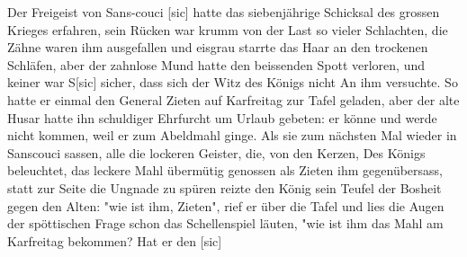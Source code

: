 \def\day{31.8.1942}
\mktitle

Der Freigeist von Sans-couci{\color{red} [sic]} hatte das siebenj\"{a}hrige Schicksal des grossen Krieges erfahren, sein R\"{u}cken war krumm von der Last so vieler Schlachten, die Z\"{a}hne waren ihm ausgefallen und eisgrau starrte das Haar an den trockenen Schl\"{a}fen, aber der zahnlose Mund hatte den beissenden Spott verloren, und keiner war S{\color{red}[sic]} sicher, dass sich der Witz des K\"{o}nigs nicht An ihm versuchte.
So hatte er einmal den General Zieten auf Karfreitag zur Tafel geladen, aber der alte Husar hatte ihn schuldiger Ehrfurcht um Urlaub gebeten: er k\"{o}nne und werde nicht kommen, weil er zum Abeldmahl ginge.
Als sie zum n\"{a}chsten Mal wieder in Sanscouci sassen, alle die lockeren Geister, die, von den Kerzen, Des K\"{o}nigs beleuchtet, das leckere Mahl \"{u}berm\"{u}tig genossen als Zieten ihm gegen\"{u}bersass, statt zur Seite die Ungnade zu sp\"{u}ren reizte den K\"{o}nig sein Teufel der Bosheit gegen den Alten: "wie ist ihm, Zieten", rief er \"{u}ber die Tafel und lies die Augen der sp\"{o}ttischen Frage schon das Schellenspiel l\"{a}uten, "wie ist ihm das Mahl am Karfreitag bekommen? Hat er den {\color{red} [sic] }

\clearpage
